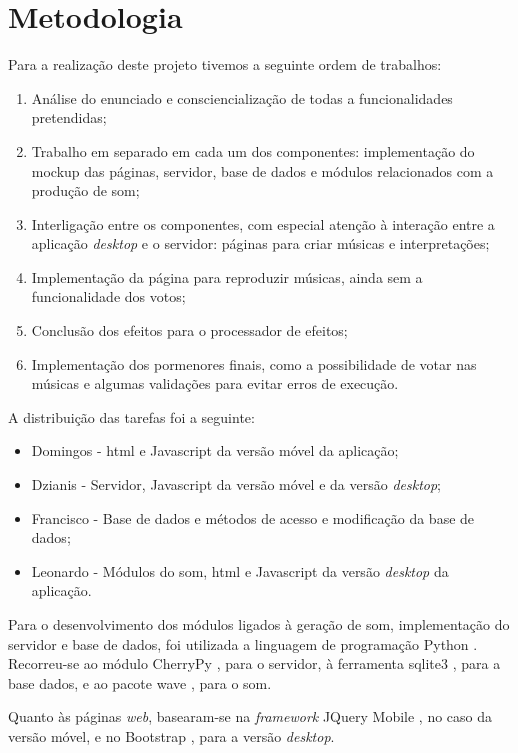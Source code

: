 \documentclass{report}
\begin{document}

\chapter{Metodologia}
\label{chap.metodologia}

Para a realização deste projeto tivemos a seguinte ordem de trabalhos:

\begin{enumerate}
\item Análise do enunciado e consciencialização de todas a funcionalidades pretendidas;
\item Trabalho em separado em cada um dos componentes: implementação do mockup das páginas, servidor, base de dados e módulos relacionados com a produção de som;
\item Interligação entre os componentes, com especial atenção à interação entre a aplicação \emph{desktop} e o servidor: páginas para criar músicas e interpretações;
\item Implementação da página para reproduzir músicas, ainda sem a funcionalidade dos votos;
\item Conclusão dos efeitos para o processador de efeitos;
\item Implementação dos pormenores finais, como a possibilidade de votar nas músicas e algumas validações para evitar erros de execução.
\end{enumerate}

A distribuição das tarefas foi a seguinte:
\begin{itemize}
\item Domingos - \ac{html} e Javascript da versão móvel da aplicação;
\item Dzianis - Servidor, Javascript da versão móvel e da versão \emph{desktop};
\item Francisco - Base de dados e métodos de acesso e modificação da base de dados;
\item Leonardo - Módulos do som, \ac{html} e Javascript da versão \emph{desktop} da aplicação.
\end{itemize}

Para o desenvolvimento dos módulos ligados à geração de som, implementação do servidor e base de dados, foi utilizada a linguagem de programação Python \cite{python}. Recorreu-se ao módulo CherryPy \cite{cherry}, para o servidor, à ferramenta sqlite3 \cite{sqlite}, para a base dados, e ao pacote wave \cite{wave}, para o som.

Quanto às páginas \emph{web}, basearam-se na \emph{framework} JQuery Mobile \cite{jquery}, no caso da versão móvel, e no Bootstrap \cite{bootstrap}, para a versão \emph{desktop}.
\end{document}
